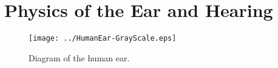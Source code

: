 \section{Physics of the Ear and Hearing}

\begin{center}
\begin{figure}[H]
\texttt{[image: ../HumanEar-GrayScale.eps]}
\caption{Diagram of the human ear. }
\label{Human Ear}
\end{figure}
\end{center}

